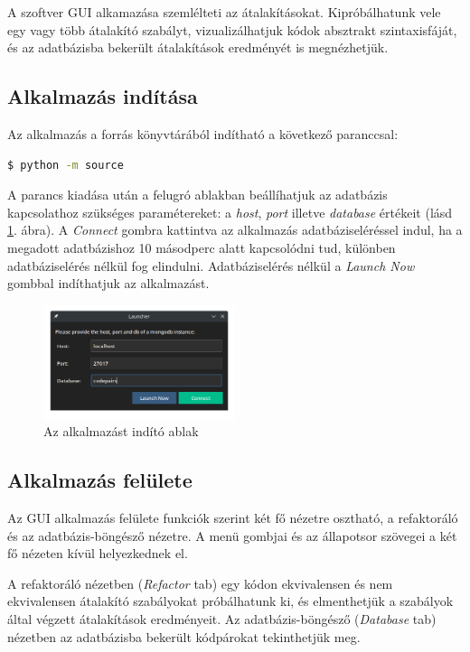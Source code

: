 A szoftver GUI alkamazása szemlélteti az átalakításokat.
Kipróbálhatunk vele egy vagy több átalakító szabályt,
vizualizálhatjuk kódok absztrakt szintaxisfáját,
és az adatbázisba bekerült átalakítások eredményét is megnézhetjük.

\subsection{Alkalmazás indítása}

Az alkalmazás a forrás könyvtárából indítható a következő paranccsal:

\begin{lstlisting}[language=bash, numbers=none]
	$ python -m source
\end{lstlisting}

A parancs kiadása után a felugró ablakban beállíhatjuk az adatbázis kapcsolathoz szükséges paramétereket:
a \emph{host}, \emph{port} illetve \emph{database} értékeit (lásd \ref{fig:launcher}. ábra).
A \emph{Connect} gombra kattintva az alkalmazás adatbáziseléréssel indul,
ha a megadott adatbázishoz 10 másodperc alatt kapcsolódni tud,
különben adatbáziselérés nélkül fog elindulni.
Adatbáziselérés nélkül a \emph{Launch Now} gombbal indíthatjuk az alkalmazást.

\begin{figure}[H]
	\centering
	\includegraphics[width=0.5\textwidth]{images/screenshots/launcher.png}
	\caption{\label{fig:launcher}Az alkalmazást indító ablak}
\end{figure}

\subsection{Alkalmazás felülete}

Az GUI alkalmazás felülete funkciók szerint két fő nézetre osztható, a refaktoráló és az adatbázis-böngésző nézetre.
A menü gombjai és az állapotsor szövegei a két fő nézeten kívül helyezkednek el.

A refaktoráló nézetben (\emph{Refactor} tab) egy kódon
ekvivalensen és nem ekvivalensen átalakító szabályokat próbálhatunk ki, és elmenthetjük
a szabályok által végzett átalakítások eredményeit.
Az adatbázis-böngésző (\emph{Database} tab) nézetben az adatbázisba bekerült kódpárokat tekinthetjük meg.

